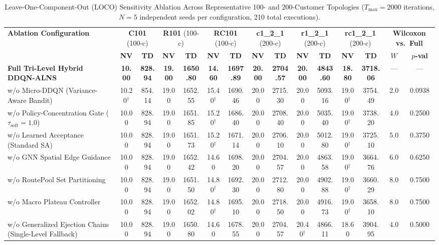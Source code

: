 \documentclass{ieeeaccess}
\begin{document}
\begin{table}[!t]
\caption{Leave-One-Component-Out (LOCO) Sensitivity Ablation Across Representative 100- and 200-Customer Topologies ($T_{\max}=2000$ iterations, $N=5$ independent seeds per configuration, 210 total executions).}
\label{tab:loco_ablation_matrix}
\centering
\scriptsize
\setlength{\tabcolsep}{1.4pt}
\begin{tabular*}{\textwidth}{@{\extracolsep{\fill}} l cc cc cc cc cc cc cc @{}}
\toprule
\multirow{2}{*}{\textbf{Ablation Configuration}} & \multicolumn{2}{c}{\textbf{C101} (100-c)} & \multicolumn{2}{c}{\textbf{R101} (100-c)} & \multicolumn{2}{c}{\textbf{RC101} (100-c)} & \multicolumn{2}{c}{\textbf{c1\_2\_1} (200-c)} & \multicolumn{2}{c}{\textbf{r1\_2\_1} (200-c)} & \multicolumn{2}{c}{\textbf{rc1\_2\_1} (200-c)} & \multicolumn{2}{c}{\textbf{Wilcoxon vs.\ Full}} \\
\cmidrule(lr){2-3} \cmidrule(lr){4-5} \cmidrule(lr){6-7} \cmidrule(lr){8-9} \cmidrule(lr){10-11} \cmidrule(lr){12-13} \cmidrule(lr){14-15}
 & \textbf{NV} & \textbf{TD} & \textbf{NV} & \textbf{TD} & \textbf{NV} & \textbf{TD} & \textbf{NV} & \textbf{TD} & \textbf{NV} & \textbf{TD} & \textbf{NV} & \textbf{TD} & $W$ & $p$\textbf{-val} \\
\midrule
\textbf{Full Tri-Level Hybrid DDQN-ALNS} & \textbf{10.00} & \textbf{828.94} & \textbf{19.00} & \textbf{1650.80} & \textbf{14.60} & \textbf{1697.89} & \textbf{20.00} & \textbf{2704.57} & \textbf{20.00} & \textbf{4843.60} & \textbf{18.80} & \textbf{3718.06} & --- & --- \\
\midrule
w/o Micro-DDQN (Variance-Aware Bandit) & 10.20$^\dagger$ & 854.14 & 19.00 & 1652.55 & 15.40$^\dagger$ & 1690.46 & 20.00 & 2715.30 & 20.00 & 5093.16 & 19.00$^\dagger$ & 3754.49 & 2.0 & 0.0938 \\
w/o Policy-Concentration Gate ($\tau_{\text{soft}}=1.0$) & 10.00 & 828.94 & 19.00 & 1651.85 & 15.20$^\dagger$ & 1686.40 & 20.00 & 2708.40 & 20.00 & 5035.40 & 19.00$^\dagger$ & 3738.20 & 4.0 & 0.2500 \\
w/o Learned Acceptance (Standard SA) & 10.00 & 828.94 & 19.00 & 1651.73 & 15.20$^\dagger$ & 1671.14 & 20.00 & 2706.10 & 20.00 & 5012.80 & 19.00$^\dagger$ & 3725.10 & 5.0 & 0.3750 \\
w/o GNN Spatial Edge Guidance & 10.00 & 828.94 & 19.00 & 1652.42 & 14.60 & 1698.20 & 20.00 & 2704.57 & 20.00 & 4863.58 & 19.00$^\dagger$ & 3664.76 & 6.0 & 0.6250 \\
w/o RoutePool Set Partitioning & 10.00 & 828.94 & 19.00 & 1651.50 & 14.80$^\dagger$ & 1692.30 & 20.00 & 2712.80 & 20.00 & 4902.88 & 19.00$^\dagger$ & 3660.29 & 8.0 & 0.7500 \\
w/o Macro Plateau Controller & 10.00 & 828.94 & 19.00 & 1652.02 & 14.80$^\dagger$ & 1695.10 & 20.00 & 2718.50 & 20.00 & 4916.73 & 19.00$^\dagger$ & 3658.10 & 8.0 & 0.7500 \\
w/o Generalized Ejection Chains (Single-Level Fallback) & 10.00 & 828.94 & 19.00 & 1650.80 & 14.60 & 1678.55 & 20.00 & 2704.57 & 20.40$^\dagger$ & 4866.11 & 18.60 & 3904.95 & 4.0 & 0.5000 \\
\bottomrule
\end{tabular*}
{\raggedright 
\footnotesize 

}
\end{table}
\end{document}
